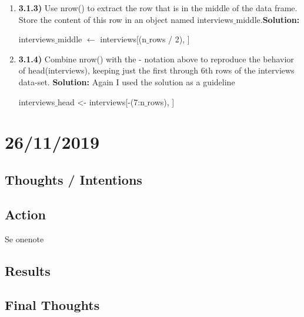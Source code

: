 \documentclass{article}
\begin{document}
\begin{enumerate}
\begin{enumerate}
    \item \textbf{3.1.3)} Use nrow() to extract the row that is in the middle of the data frame. Store the content of this row in an object named interviews$\_$middle.\textbf{Solution:}
\begin{center}
 interviews$\_$middle $\leftarrow$ interviews[(n$\_$rows / 2), ]   
\end{center}
    \item \textbf{3.1.4) }Combine nrow() with the - notation above to reproduce the behavior of head(interviews), keeping just the first through 6th rows of the interviews data-set. \textbf{Solution:} Again I used the solution as a guideline
\begin{center}
    interviews$\_$head <- interviews[-(7:n$\_$rows), ]
\end{center}
    \end{enumerate}
\end{enumerate}

\newpage
\section{26/11/2019}
\subsection{Thoughts / Intentions}
\subsection{Action}
Se onenote
\subsection{Results}
\subsection{Final Thoughts}
\end{document}

